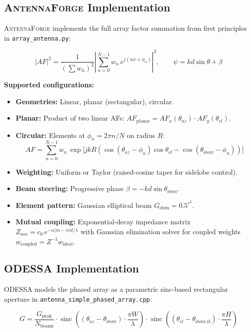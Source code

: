 \documentclass[11pt,a4paper]{article}
\newcommand{\AF}{\textsc{AntennaForge}}
\newcommand{\OD}{\textsc{ODESSA}}
\newcommand{\sinc}{\operatorname{sinc}}
\begin{document}
\subsection{\AF{} Implementation}

\AF{} implements the full array factor summation from first principles in
\texttt{array\_antenna.py}:

\begin{equation}
  |AF|^2 = \frac{1}{(\sum w_n)^2}
    \left|\sum_{n=0}^{N-1} w_n \, e^{j(n\psi + \phi_n)}\right|^2,
  \qquad
  \psi = k d \sin\theta + \beta
\end{equation}

\textbf{Supported configurations:}
\begin{itemize}[leftmargin=2em]
  \item \textbf{Geometries:} Linear, planar (rectangular), circular.
  \item \textbf{Planar:} Product of two linear AFs:
    $AF_{\text{planar}} = AF_x(\theta_{az}) \cdot AF_y(\theta_{el})$.
  \item \textbf{Circular:} Elements at $\phi_n = 2\pi n / N$ on radius $R$:
    \[
      AF = \sum_{n=0}^{N-1} w_n \,
        \exp\!\bigl[j k R (\cos(\theta_{az} - \phi_n)\cos\theta_{el}
        - \cos(\theta_{\text{steer}} - \phi_n))\bigr]
    \]
  \item \textbf{Weighting:} Uniform or Taylor (raised-cosine taper for sidelobe
    control).
  \item \textbf{Beam steering:} Progressive phase
    $\beta = -k d \sin\theta_{\text{steer}}$.
  \item \textbf{Element pattern:} Gaussian elliptical beam
    $G_{\text{elem}} = 0.5^{r^2}$.
  \item \textbf{Mutual coupling:} Exponential-decay impedance matrix
    $Z_{mn} = c_0 \, e^{-\alpha |m-n| d/\lambda}$ with Gaussian elimination
    solver for coupled weights $w_{\text{coupled}} = Z^{-1} w_{\text{ideal}}$.
\end{itemize}

\subsection{\OD{} Implementation}

\OD{} models the phased array as a parametric sinc-based rectangular aperture
in \texttt{antenna\_simple\_phased\_array.cpp}:

\begin{equation}
  G = \frac{G_{\text{peak}}}{N_{\text{beams}}} \cdot
    \sinc\!\left((\theta_{az} - \theta_{\text{steer}}) \cdot
    \frac{\pi W}{\lambda}\right) \cdot
    \sinc\!\left((\theta_{el} - \theta_{\text{steer,el}}) \cdot
    \frac{\pi H}{\lambda}\right)
  \label{eq:od_array}
\end{equation}
\end{document}
